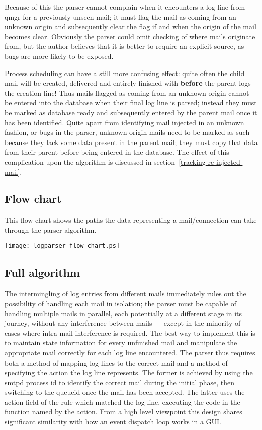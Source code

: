 \documentclass[a4paper,12pt,draft]{article}
\begin{document}
Because of this the parser cannot complain when it encounters a log line
from qmgr for a previously unseen mail; it must flag the mail as coming
from an unknown origin and subsequently clear the flag if and when the
origin of the mail becomes clear.  Obviously the parser could omit checking
of where mails originate from, but the author believes that it is better to
require an explicit source, as bugs are more likely to be exposed.

Process scheduling can have a still more confusing effect: quite often the
child mail will be created, delivered and entirely finished with
\textbf{before} the parent logs the creation line!  Thus mails flagged as
coming from an unknown origin cannot be entered into the database when
their final log line is parsed; instead they must be marked as database
ready and subsequently entered by the parent mail once it has been
identified.  Quite apart from identifying mail injected in an unknown
fashion, or bugs in the parser, unknown origin mails need to be marked as
such because they lack some data present in the parent mail; they must copy
that data from their parent before being entered in the database.
The effect of this complication upon the algorithm is discussed in
section~\ref{tracking-re-injected-mail}.



\newpage
\subsection{Flow chart}

\label{flow-chart}

This flow chart shows the paths the data representing a mail/connection can
take through the parser algorithm.

\texttt{[image: logparser-flow-chart.ps]}

\subsection{Full algorithm}

\label{full-algorithm}

The intermingling of log entries from different mails immediately rules out
the possibility of handling each mail in isolation; the parser must be
capable of handling multiple mails in parallel, each potentially at a
different stage in its journey, without any interference between mails ---
except in the minority of cases where intra-mail interference is required.
The best way to implement this is to maintain state information for every
unfinished mail and manipulate the appropriate mail correctly for each log
line encountered.  The parser thus requires both a method of mapping log
lines to the correct mail and a method of specifying the action the log
line represents.  The former is achieved by using the smtpd process id to
identify the correct mail during the initial phase, then switching to the
queueid once the mail has been accepted.  The latter uses the action field
of the rule which matched the log line, executing the code in the function
named by the action.  From a high level viewpoint this design shares
significant similarity with how an event dispatch loop works in a GUI\@.
\end{document}
